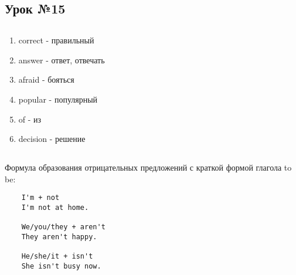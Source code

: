 \subsection{Урок №15}

\subsection*{}
\begin{multicols}{2}
    \begin{enumerate}\setlength{\itemsep}{0pt}
        \item correct - правильный
        \item answer - ответ, отвечать
        \item afraid - бояться
        \item popular - популярный
        \item of - из
        \item decision - решение
    \end{enumerate}
\end{multicols}

\subsection*{}
Формула образования отрицательных предложений с краткой формой глагола to be:
\begin{verbatim}
    I'm + not
    I'm not at home.

    We/you/they + aren't
    They aren't happy.

    He/she/it + isn't
    She isn't busy now.
\end{verbatim}